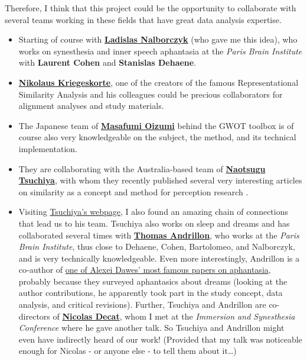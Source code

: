 \documentclass[
  authoryear]{elsarticle}
\begin{document}
Therefore, I think that this project could be the opportunity to
collaborate with several teams working in these fields that have great
data analysis expertise.

\begin{itemize}
\item
  Starting of course with
  \href{https://lnalborczyk.github.io/}{\textbf{Ladislas Nalborczyk}}
  (who gave me this idea), who works on synesthesia and inner speech
  aphantasia at the \emph{Paris Brain Institute} with \textbf{Laurent
  Cohen} and \textbf{Stanislas Dehaene}.
\item
  \href{https://zuckermaninstitute.columbia.edu/nikolaus-kriegeskorte-phd}{\textbf{Nikolaus
  Kriegeskorte}}, one of the creators of the famous Representational
  Similarity Analysis \citep[RSA, another \emph{supervised} alignment
  method, see][]{kriegeskorte2008} and his colleagues could be precious
  collaborators for alignment analyses and study materials.
\item
  The Japanese team of
  \href{https://sites.google.com/a/g.ecc.u-tokyo.ac.jp/oizumi-lab/home/member/masafumi_oizumi?pli=1}{\textbf{Masafumi
  Oizumi}} behind the GWOT toolbox is of course also very knowledgeable
  on the subject, the method, and its technical implementation.
\item
  They are collaborating with the Australia-based team of
  \href{https://research.monash.edu/en/persons/nao-tsuchiya}{\textbf{Naotsugu
  Tsuchiya}}, with whom they recently published several very interesting
  articles on similarity as a concept and method for perception research
  \citep[e.g.][]{tsuchiyaEnrichedCategoryModel2022, kawakita2023, kawakitaComparingColorSimilarity2023, zeleznikow-johnstonAreColorExperiences2023}.
\item
  Visiting
  \href{https://research.monash.edu/en/persons/nao-tsuchiya}{Tsuchiya's
  webpage}, I also found an amazing chain of connections that lead us to
  his team. Tsuchiya also works on sleep and dreams and has collaborated
  several times with
  \href{https://www.movit.paris/team-pi/thomas-andrillon}{\textbf{Thomas
  Andrillon}}, who works at the \emph{Paris Brain Institute}, thus close
  to Dehaene, Cohen, Bartolomeo, and Nalborczyk, and is very technically
  knowledgeable. Even more interestingly, Andrillon is a co-author of
  \href{https://www.nature.com/articles/s41598-020-65705-7}{one of
  Alexei Dawes' most famous papers on aphantasia}, probably because they
  surveyed aphantasics about dreams (looking at the author
  contributions, he apparently took part in the study concept, data
  analysis, and critical revisions). Further, Tsuchiya and Andrillon are
  co-directors of
  \href{https://www.movit.paris/team-members/decat-nicolas}{\textbf{Nicolas
  Decat}}, whom I met at the \emph{Immersion and Synesthesia Conference}
  where he gave another talk. So Tsuchiya and Andrillon might even have
  indirectly heard of our work! (Provided that my talk was noticeable
  enough for Nicolas - or anyone else - to tell them about it\ldots)
\end{itemize}
\end{document}
